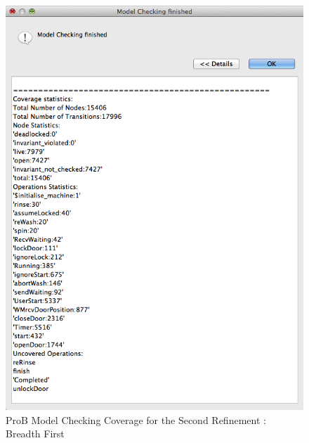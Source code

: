 \begin{figure}[!htbp]
  \includegraphics[width=1\textwidth]{figures/image34.png}
  \fi
  \caption{ProB Model Checking Coverage for the Second Refinement : Breadth First}
  \label{fig:ProBModelCheckingCoverageForTheSecondRefinementBreadthFirst}
\end{figure} 
 
